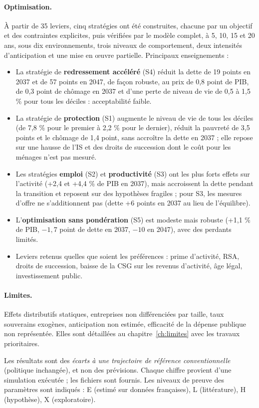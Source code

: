 \paragraph{Optimisation.} À partir de 35 leviers, cinq stratégies ont été construites, chacune par un objectif et des
contraintes explicites, puis vérifiées par le modèle complet, à 5, 10, 15 et 20 ans, sous dix environnements, trois
niveaux de comportement, deux intensités d'anticipation et une mise en œuvre partielle. Principaux enseignements :
\begin{itemize}
\item La stratégie de \textbf{redressement accéléré} (S4) réduit la dette de 19 points en 2037 et de 57 points en
2047, de façon robuste, au prix de 0,8 point de PIB, de 0,3 point de chômage en 2037 et d'une perte de niveau de vie
de 0,5 à 1,5 \% pour tous les déciles : acceptabilité faible.
\item La stratégie de \textbf{protection} (S1) augmente le niveau de vie de tous les déciles (de 7,8 \% pour le
premier à 2,2 \% pour le dernier), réduit la pauvreté de 3,5 points et le chômage de 1,4 point, sans accroître la
dette en 2037 ; elle repose sur une hausse de l'IS et des droits de succession dont le coût pour les ménages n'est pas
mesuré.
\item Les stratégies \textbf{emploi} (S2) et \textbf{productivité} (S3) ont les plus forts effets sur l'activité
(+2,4 et +4,4 \% de PIB en 2037), mais accroissent la dette pendant la transition et reposent sur des hypothèses
fragiles ; pour S3, les mesures d'offre ne s'additionnent pas (dette +6 points en 2037 au lieu de l'équilibre).
\item L'\textbf{optimisation sans pondération} (S5) est modeste mais robuste (+1,1 \% de PIB, $-1{,}7$ point de dette en
2037, $-10$ en 2047), avec des perdants limités.
\item Leviers retenus quelles que soient les préférences : prime d'activité, RSA, droits de succession, baisse de la
CSG sur les revenus d'activité, âge légal, investissement public.
\end{itemize}

\paragraph{Limites.} Effets distributifs statiques, entreprises non différenciées par taille, taux souverains exogènes,
anticipation non estimée, efficacité de la dépense publique non représentée. Elles sont détaillées au
chapitre~\ref{ch:limites} avec les travaux prioritaires.

\begin{hypothese}
Les résultats sont des \emph{écarts à une trajectoire de référence conventionnelle} (politique inchangée), et non des
prévisions. Chaque chiffre provient d'une simulation exécutée ; les fichiers sont fournis. Les niveaux de preuve des
paramètres sont indiqués : E (estimé sur données françaises), L (littérature), H (hypothèse), X (exploratoire).
\end{hypothese}
